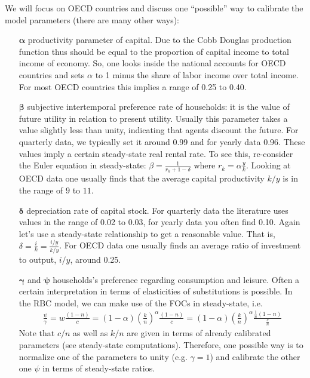 \begin{enumerate}
We will focus on OECD countries and discuss one \enquote{possible} way to calibrate the model parameters (there are many other ways):
\begin{itemize}
\item[$\boldsymbol{\alpha}$] productivity parameter of capital.
Due to the Cobb Douglas production function thus should be equal to the proportion of capital income to total income of economy.
So, one looks inside the national accounts for OECD countries and sets $\alpha$ to 1 minus the share of labor income over total income.
For most OECD countries this implies a range of 0.25 to 0.40.
\item[$\boldsymbol{\beta}$] subjective intertemporal preference rate of households:
  it is the value of future utility in relation to present utility.
Usually this parameter takes a value slightly less than unity, indicating that agents discount the future.
For quarterly data, we typically set it around 0.99 and for yearly data 0.96.
These values imply a certain steady-state real rental rate.
To see this, re-consider the Euler equation in steady-state: $\beta = \frac{1}{r_k+1-\delta}$ where $r_k= \alpha \frac{y}{k}$.
Looking at OECD data one usually finds that the average capital productivity $k/y$ is in the range of $9$ to $11$.
\item[$\boldsymbol{\delta}$] depreciation rate of capital stock.
For quarterly data the literature uses values in the range of 0.02 to 0.03, for yearly data you often find 0.10.
Again let's use a steady-state relationship to get a reasonable value.
That is, $\delta=\frac{i}{k}=\frac{i/y}{k/y}$.
For OECD data one usually finds an average ratio of investment to output, $i/y$, around 0.25.
\item[$\boldsymbol{\gamma}$ and $\boldsymbol{\psi}$] households's preference regarding consumption and leisure.
Often a certain interpretation in terms of elasticities of substitutions is possible.
In the RBC model, we can make use of the FOCs in steady-state, i.e.
\begin{align*}
\frac{\psi}{\gamma} = w\frac{(1-n)}{c}= (1-\alpha)\left(\frac{k}{n}\right)^\alpha\frac{(1-n)}{c} = (1-\alpha)\left(\frac{k}{n}\right)^\alpha\frac{\frac{1}{n}(1-n)}{\frac{c}{n}}
\end{align*}
Note that $c/n$ as well as $k/n$ are given in terms of already calibrated parameters (see steady-state computations).
Therefore, one possible way is to normalize one of the parameters to unity (e.g. $\gamma=1$)
  and calibrate the other one $\psi$ in terms of steady-state ratios.

\end{itemize}
\end{enumerate}
